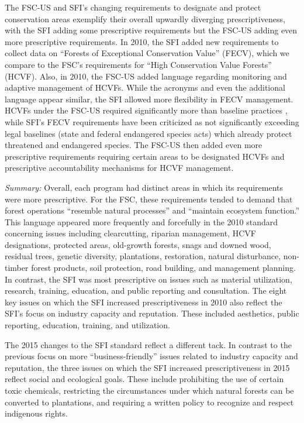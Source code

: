 \documentclass[
      12pt,
            Review ]{article}
\begin{document}
The FSC-US and SFI's changing requirements to designate and protect
conservation areas exemplify their overall upwardly diverging
prescriptiveness, with the SFI adding some prescriptive requirements but
the FSC-US adding even more prescriptive requirements. In 2010, the SFI
added new requirements to collect data on ``Forests of Exceptional
Conservation Value'' (FECV), which we compare to the FSC's requirements
for ``High Conservation Value Forests'' (HCVF). Also, in 2010, the
FSC-US added language regarding monitoring and adaptive management of
HCVFs. While the acronyms and even the additional language appear
similar, the SFI allowed more flexibility in FECV management. HCVFs
under the FSC-US required significantly more than baseline practices
\citep{Newsom2005}, while SFI's FECV requirements have been criticized
as not significantly exceeding legal baselines (state and federal
endangered species acts) which already protect threatened and endangered
species. The FSC-US then added even more prescriptive requirements
requiring certain areas to be designated HCVFs and prescriptive
accountability mechanisms for HCVF management.

\emph{Summary:} Overall, each program had distinct areas in which its
requirements were more prescriptive. For the FSC, these requirements
tended to demand that forest operations ``resemble natural processes''
and ``maintain ecosystem function.'' This language appeared more
frequently and forcefully in the 2010 standard concerning issues
including clearcutting, riparian management, HCVF designations,
protected areas, old-growth forests, snags and downed wood, residual
trees, genetic diversity, plantations, restoration, natural disturbance,
non-timber forest products, soil protection, road building, and
management planning. In contrast, the SFI was most prescriptive on
issues such as material utilization, research, training, education, and
public reporting and consultation. The eight key issues on which the SFI
increased prescriptiveness in 2010 also reflect the SFI's focus on
industry capacity and reputation. These included aesthetics, public
reporting, education, training, and utilization.

The 2015 changes to the SFI standard reflect a different tack. In
contrast to the previous focus on more ``business-friendly'' issues
related to industry capacity and reputation, the three issues on which
the SFI increased prescriptiveness in 2015 reflect social and ecological
goals. These include prohibiting the use of certain toxic chemicals,
restricting the circumstances under which natural forests can be
converted to plantations, and requiring a written policy to recognize
and respect indigenous rights.
\end{document}
